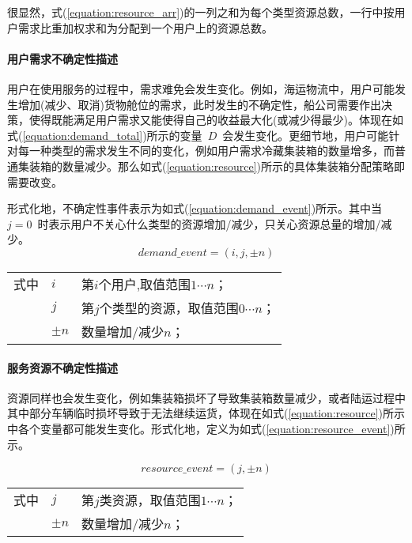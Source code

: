 很显然，式(\ref{equation:resource_arr})的一列之和为每个类型资源总数，一行中按用户需求比重加权求和为分配到一个用户上的资源总数。

\paragraph{用户需求不确定性描述}

用户在使用服务的过程中，需求难免会发生变化。例如，海运物流中，用户可能发生增加(减少、取消)货物舱位的需求，此时发生的不确定性，船公司需要作出决策，使得既能满足用户需求又能使得自己的收益最大化(或减少得最少)。体现在如式(\ref{equation:demand_total})所示的变量~$D$~会发生变化。更细节地，用户可能针对每一种类型的需求发生不同的变化，例如用户需求冷藏集装箱的数量增多，而普通集装箱的数量减少。那么如式(\ref{equation:resource})所示的具体集装箱分配策略即需要改变。

形式化地，不确定性事件表示为如式(\ref{equation:demand_event})所示。其中当~$j=0$~时表示用户不关心什么类型的资源增加/减少，只关心资源总量的增加/减少。
\begin{equation}\label{equation:demand_event}
demand\_event = (i, j, \pm n)
\end{equation}
\begin{tabularx}{\textwidth}{@{}l@{\quad}l@{\pozhehao }X@{}}
    式中
    & $i$ & 第$i$个用户,取值范围$1 \cdots n$；\\
    & $j$ & 第$j$个类型的资源，取值范围$0 \cdots n$；\\
    & $\pm n$ & 数量增加/减少$n$；
\end{tabularx}\vspace{\wordsep}

\paragraph{服务资源不确定性描述}

资源同样也会发生变化，例如集装箱损坏了导致集装箱数量减少，或者陆运过程中其中部分车辆临时损坏导致于无法继续运货，体现在如式(\ref{equation:resource})所示中各个变量都可能发生变化。形式化地，定义为如式(\ref{equation:resource_event})所示。

\begin{equation}\label{equation:resource_event}
resource\_event = (j, \pm n)
\end{equation}
\begin{tabularx}{\textwidth}{@{}l@{\quad}l@{\pozhehao }X@{}}
    式中
    & $j$ & 第$j$类资源，取值范围$1 \cdots n$；\\
    & $\pm n$ & 数量增加/减少$n$；
\end{tabularx}\vspace{\wordsep}

